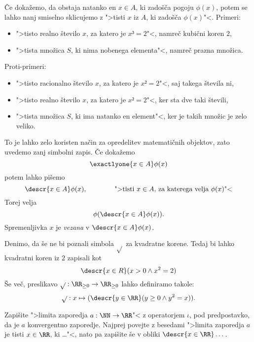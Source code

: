 Če dokažemo, da obstaja natanko en $x \in A$, ki zadošča pogoju $\phi(x)$, potem se lahko nanj smiselno sklicujemo z ">tisti $x$ iz $A$, ki zadošča $\phi(x)$"<. Primeri:
%
\begin{itemize}
\item ">tisto realno število $x$, za katero je $x³ = 2$"<, namreč kubični koren 2,
\item ">tista množica $S$, ki nima nobenega elementa"<, namreč prazna množica.
\end{itemize}
%
Proti-primeri:
%
\begin{itemize}
\item ">tisto racionalno število $x$, za katero je $x² = 2$"<, saj takega števila ni,
\item ">tisto realno število $x$, za katero je $x² = 2$"<, ker sta dve taki števili,
\item ">tista množica $S$, ki ima natanko en element"<, ker je takih množic je zelo veliko.
\end{itemize}
%
To je lahko zelo koristen način za opredelitev matematičnih objektov, zato uvedemo zanj simbolni zapis. Če dokažemo
%
\begin{equation*}
    \exactlyone{x \in A} \phi(x)
\end{equation*}
%
potem lahko pišemo
%
\begin{equation*}
  \descr{x \in A} \phi(x),
  \qquad\qquad\text{">tisti $x \in A$, za katerega velja $\phi(x)$"<}
\end{equation*}
%
Torej velja
%
\begin{equation*}
  \phi(\descr{x \in A} \phi(x)).
\end{equation*}
%
Spremenljivka $x$ je \emph{vezana} v $\descr{x \in A} \phi(x)$.

\begin{primer}
  Denimo, da še ne bi poznali simbola $\sqrt{}$ za kvadratne korene. Tedaj bi
  lahko kvadratni koren iz $2$ zapisali kot
  \begin{equation*}
    \descr{x \in R} (x > 0 \land x^2 = 2)
  \end{equation*}
  Še več, preslikavo $\sqrt{} : \RR_{\geq 0} \to \RR_{\geq 0}$ lahko definiramo takole:
  \begin{equation*}
    \sqrt{} : x \mapsto (\descr{y \in \RR} (y \geq 0 \land y^2 = x)).
  \end{equation*}
\end{primer}

\begin{naloga}
  Zapišite ">limita zaporedja $a : \NN \to \RR$"< z operatorjem $\iota$, pod predpostavko,
  da je $a$ konvergentno zaporedje. Najprej povejte z besedami ">limita zaporedja $a$ je
  tisti $x \in \RR$, ki \dots"<, nato pa zapišite še v obliki $\descr{x \in \RR} \dots$.
\end{naloga}


